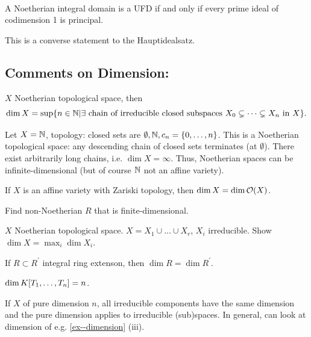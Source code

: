 \documentclass[a4paper,11pt]{article}
\begin{document}
			\begin{thm}
				\phantom{}\\ A Noetherian integral domain is a UFD if and only if every prime ideal of codimension 1 is principal.
			\end{thm}

			\begin{remark}
				This is a converse statement to the Hauptidealsatz.
			\end{remark}

			{\color{gray}\subsection*{Comments on Dimension:}
			
				$X$ Noetherian topological space, then
				\begin{equation*}
					\dim X=\sup\{n\in\mathbb{N}|\exists\text{ chain of irreducible closed subspaces }X_0\subsetneq\dots\subsetneq X_n\text{ in }X\}.
				\end{equation*}

				\begin{eg}
					Let $X=\mathbb{N}$, topology: closed sets are $\emptyset,\mathbb{N},c_n=\{0,\dots,n\}$. This is a Noetherian topological space: any descending chain of closed sets terminates (at $\emptyset$). There exist arbitrarily long chains, i.e. $\dim X=\infty$. Thus, Noetherian spaces can be infinite-dimensional (but of course $\mathbb{N}$ not an affine variety).
				\end{eg}

				If $X$ is an affine variety with Zariski topology, then $\dim X=\dim\mathcal{O}(X)$.

				\begin{exc}
					Find non-Noetherian $R$ that is finite-dimensional.
				\end{exc}

				\begin{exc}
					$X$ Noetherian topological space. $X=X_1\cup\dots\cup X_r$, $X_i$ irreducible. Show $\dim X=\max_i\dim X_i$.
				\end{exc}

				\begin{prop}
					If $R\subset R^\prime$ integral ring extenson, then $\dim R=\dim R^\prime$.
				\end{prop}

				\begin{cor}
					$\dim K[T_1,\dots,T_{n}]=n$.
				\end{cor}

				\begin{remark}
					If $X$ of pure dimension $n$, all irreducible components have the same dimension and the pure dimension applies to irreducible (sub)spaces. In general, can look at dimension of e.g. \autoref{ex--dimension} (iii).
				\end{remark}

}
\end{document}
